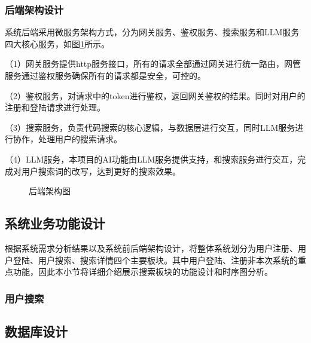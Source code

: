 \documentclass[UTF8,a4paper,12pt]{ctexart}
\numberwithin{equation}{section}
\begin{document}
\subsubsection{后端架构设计}
系统后端采用微服务架构方式，分为网关服务、鉴权服务、搜索服务和LLM服务四大核心服务，如图\ref{back_model}所示。\par
（1）网关服务提供http服务接口，所有的请求全部通过网关进行统一路由，网管服务通过鉴权服务确保所有的请求都是安全，可控的。\par
（2）鉴权服务，对请求中的token进行鉴权，返回网关鉴权的结果。同时对用户的注册和登陆请求进行处理。\par
（3）搜索服务，负责代码搜索的核心逻辑，与数据层进行交互，同时LLM服务进行协作，处理用户的搜索请求。\par
（4）LLM服务，本项目的AI功能由LLM服务提供支持，和搜索服务进行交互，完成对用户搜索词的改写，达到更好的搜索效果。\par
\begin{figure}[H]
	\caption{后端架构图}
	\label{back_model}
\end{figure}
\subsection{系统业务功能设计}
根据系统需求分析结果以及系统前后端架构设计，将整体系统划分为用户注册、用户登陆、用户搜索、搜索详情四个主要板块。其中用户登陆、注册非本次系统的重点功能，因此本小节将详细介绍展示搜索板块的功能设计和时序图分析。
\subsubsection{用户搜索}
\subsection{数据库设计}
\end{document}
